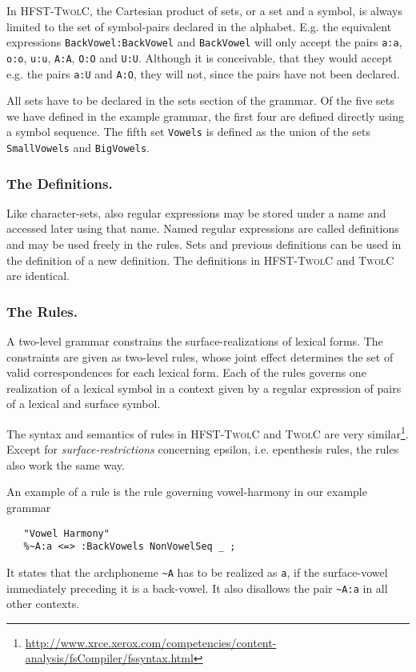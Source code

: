 \documentclass[a4paper]{article}
\begin{document}
In \textsc{HFST-TwolC}, the Cartesian product of sets, or a set and a
symbol, is always limited to the set of symbol-pairs declared in the
alphabet. E.g. the equivalent expressions \verb|BackVowel:BackVowel|
and \verb|BackVowel| will only accept the pairs \verb|a:a|,
\verb|o:o|, \verb|u:u|, \verb|A:A|, \verb|O:O| and
\verb|U:U|. Although it is conceivable, that they would accept
e.g. the pairs \verb|a:U| and \verb|A:O|, they will not, since the
pairs have not been declared.

All sets have to be declared in the sets section of the grammar. Of
the five sets we have defined in the example grammar, the first four
are defined directly using a symbol sequence. The fifth set
\verb|Vowels| is defined as the union of the sets \verb|SmallVowels|
and \verb|BigVowels|.

\subsubsection{The Definitions.}

Like character-sets, also regular expressions may be stored under a
name and accessed later using that name. Named regular expressions are
called definitions and may be used freely in the rules. Sets and
previous definitions can be used in the definition of a new
definition. The definitions in \textsc{HFST-TwolC} and \textsc{TwolC}
are identical.
 
\subsubsection{The Rules.}

A two-level grammar constrains the surface-realizations of lexical
forms. The constraints are given as two-level rules, whose joint
effect determines the set of valid correspondences for each lexical
form. Each of the rules governs one realization of a lexical symbol in
a context given by a regular expression of pairs of a lexical and
surface symbol.

The syntax and semantics of rules in \textsc{HFST-TwolC} and
\textsc{TwolC} are very
similar\footnote{\url{http://www.xrce.xerox.com/competencies/content-analysis/fsCompiler/fssyntax.html}}.
Except for \textit{surface-restrictions} concerning epsilon,
i.e. epenthesis rules, the rules also work the same way.

An example of a rule is the rule governing vowel-harmony in our example grammar
\begin{verbatim}
   "Vowel Harmony"
   %~A:a <=> :BackVowels NonVowelSeq _ ;
\end{verbatim}
It states that the archphoneme \verb|~A| has to be realized as
\verb|a|, if the surface-vowel immediately preceding it is a
back-vowel. It also disallows the pair \verb|~A:a| in all other
contexts.
\end{document}

